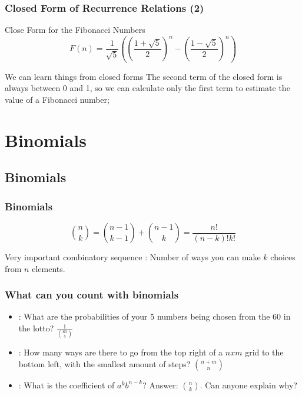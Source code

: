 \documentclass{beamer}
\begin{document}
\begin{frame}
  \frametitle{Closed Form of Recurrence Relations (2)}
  {\small
  \begin{block}{Close Form for the Fibonacci Numbers}
    \begin{equation*}
      F(n) = \frac{1}{\sqrt{5}}\left(\left(\frac{1+\sqrt{5}}{2}\right)^n - \left(\frac{1-\sqrt{5}}{2}\right)^n\right)    
    \end{equation*}    
  \end{block}
  \begin{block}{We can learn things from closed forms}
    The second term of the closed form is always between 0 and 1, so
    we can calculate only the first term to estimate the value of a
    Fibonacci number;
  \end{block}
  }
\end{frame}

\section{Binomials}
\subsection{Binomials}
\begin{frame}
  \frametitle{Binomials}
  \begin{equation*}
    \binom{n}{k} = \binom{n-1}{k-1}+\binom{n-1}{k} = \frac{n!}{(n-k)!k!}
  \end{equation*}
  \begin{block}{Very important combinatory sequence}
    : Number of ways you can make $k$ choices from $n$ elements.
  \end{block}
\end{frame}

\begin{frame}
  \frametitle{What can you count with binomials}
  {\small
  \begin{itemize}
    \item {}: What are the probabilities of
      your 5 numbers being chosen from the 60 in the lotto? $\frac{1}{\binom{60}{5}}$
    \item {}: How many ways are there to
      go from the top right of a $nxm$ grid to the bottom left, with the
      smallest amount of steps? $\binom{n+m}{n}$
    \item {}: What is the
      coefficient of $a^kb^{n-k}$? Answer: $\binom{n}{k}$. Can anyone
      explain why?
  \end{itemize}
  }
\end{frame}
\end{document}
